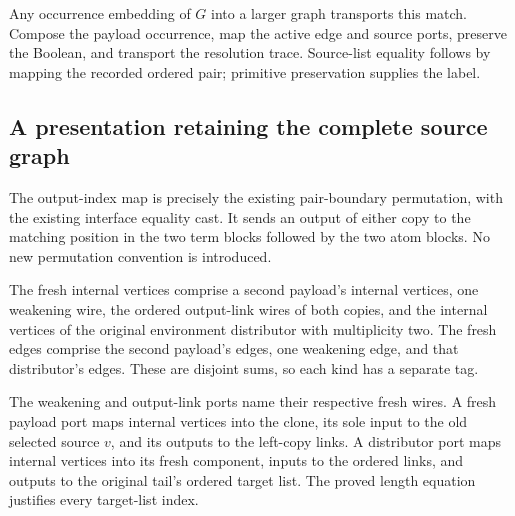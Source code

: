

Any occurrence embedding of $G$ into a larger graph transports this match.
Compose the payload occurrence, map the active edge and source ports, preserve
the Boolean, and transport the resolution trace. Source-list equality follows
by mapping the recorded ordered pair; primitive preservation supplies the label.


\subsection{A presentation retaining the complete source graph}

The output-index map is precisely the existing pair-boundary permutation,
with the existing interface equality cast. It sends an output of either copy
to the matching position in the two term blocks followed by the two atom
blocks. No new permutation convention is introduced.


The fresh internal vertices comprise a second payload's internal vertices,
one weakening wire, the ordered output-link wires of both copies, and the
internal vertices of the original environment distributor with multiplicity
two. The fresh edges comprise the second payload's edges, one weakening edge,
and that distributor's edges. These are disjoint sums, so each kind has a
separate tag.



The weakening and output-link ports name their respective fresh wires.
A fresh payload port maps internal vertices into the clone, its sole input to
the old selected source $v$, and its outputs to the left-copy links. A distributor
port maps internal vertices into its fresh component, inputs to the ordered
links, and outputs to the original tail's ordered target list. The proved
length equation justifies every target-list index.


